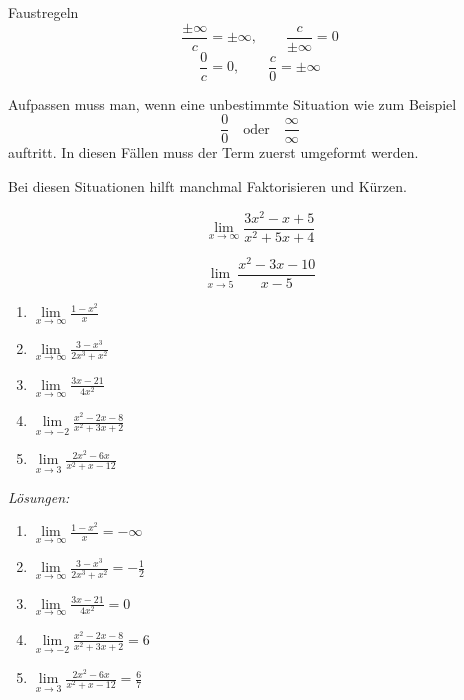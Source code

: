\begin{satz}
    {Faustregeln}{}
    \[
\frac{\pm\infty}{c} = \pm\infty , 
\qquad
\frac{c}{\pm\infty} = 0
\]
\[
\frac{0}{c} = 0 , 
\qquad
\frac{c}{0} = \pm\infty
\]
\end{satz}

Aufpassen muss man, wenn eine unbestimmte Situation wie zum Beispiel 
\[
\frac{0}{0} \quad \text{oder} \quad \frac{\infty}{\infty}
\]
auftritt. In diesen Fällen muss der Term zuerst umgeformt werden. 

Bei diesen Situationen hilft manchmal Faktorisieren und Kürzen.

\begin{bsp}
    {}{}
\[
\lim\limits_{x \to \infty} \frac{3x^2 - x + 5}{x^2 + 5x + 4}
\]
\vspace{3cm}
\end{bsp}

\begin{bsp}
    {}{}
\[
\lim\limits_{x \to 5} \frac{x^2 - 3x - 10}{x - 5}
\]
\vspace{3cm}
\end{bsp}

\begin{ueb}
    {}{}
    \begin{enumerate}
        \item $\lim\limits_{x \to \infty} \frac{1-x^2}{x}$
        \item $\lim\limits_{x \to \infty} \frac{3-x^3}{2x^3+x^2}$
        \item $\lim\limits_{x \to \infty} \frac{3x-21}{4x^2}$
        \item $\lim\limits_{x \to -2} \frac{x^2 - 2x - 8}{x^2 + 3x + 2}$
        \item $\lim\limits_{x \to 3} \frac{2x^2 - 6x}{x^2 + x - 12}$
    \end{enumerate}
\end{ueb}


\clearpage
\emph{Lösungen:}

\begin{enumerate}
    \item $\lim\limits_{x \to \infty} \frac{1-x^2}{x} = -\infty$
    \item $\lim\limits_{x \to \infty} \frac{3-x^3}{2x^3+x^2} = -\frac{1}{2}$
    \item $\lim\limits_{x \to \infty} \frac{3x-21}{4x^2} = 0$
    \item $\lim\limits_{x \to -2} \frac{x^2 - 2x - 8}{x^2 + 3x + 2} = 6$
    \item $\lim\limits_{x \to 3} \frac{2x^2 - 6x}{x^2 + x - 12} = \frac{6}{7}$
\end{enumerate}

















